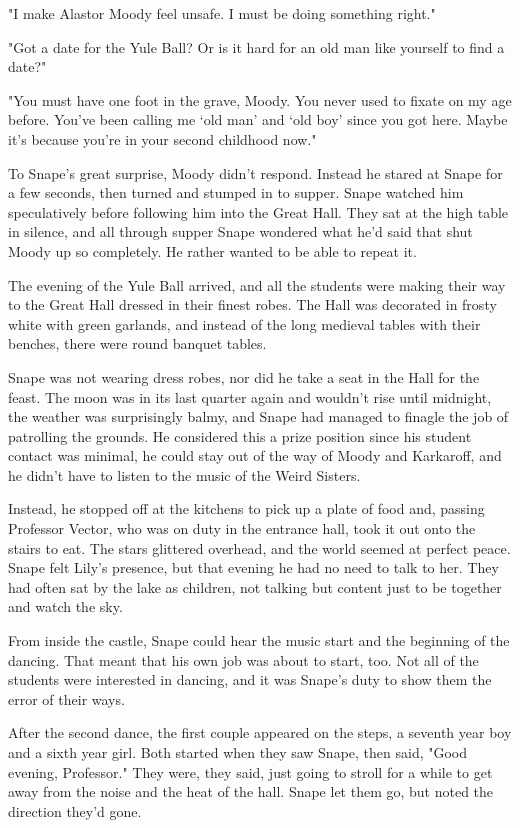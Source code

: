 "I make Alastor Moody feel unsafe. I must be doing something right."

"Got a date for the Yule Ball? Or is it hard for an old man like yourself to find a date?"

"You must have one foot in the grave, Moody. You never used to fixate on my age before. You've been calling me `old man' and `old boy' since you got here. Maybe it's because you're in your second childhood now."

To Snape's great surprise, Moody didn't respond. Instead he stared at Snape for a few seconds, then turned and stumped in to supper. Snape watched him speculatively before following him into the Great Hall. They sat at the high table in silence, and all through supper Snape wondered what he'd said that shut Moody up so completely. He rather wanted to be able to repeat it.

The evening of the Yule Ball arrived, and all the students were making their way to the Great Hall dressed in their finest robes. The Hall was decorated in frosty white with green garlands, and instead of the long medieval tables with their benches, there were round banquet tables.

Snape was not wearing dress robes, nor did he take a seat in the Hall for the feast. The moon was in its last quarter again and wouldn't rise until midnight, the weather was surprisingly balmy, and Snape had managed to finagle the job of patrolling the grounds. He considered this a prize position since his student contact was minimal, he could stay out of the way of Moody and Karkaroff, and he didn't have to listen to the music of the Weird Sisters.

Instead, he stopped off at the kitchens to pick up a plate of food and, passing Professor Vector, who was on duty in the entrance hall, took it out onto the stairs to eat. The stars glittered overhead, and the world seemed at perfect peace. Snape felt Lily's presence, but that evening he had no need to talk to her. They had often sat by the lake as children, not talking but content just to be together and watch the sky.

From inside the castle, Snape could hear the music start and the beginning of the dancing. That meant that his own job was about to start, too. Not all of the students were interested in dancing, and it was Snape's duty to show them the error of their ways.

After the second dance, the first couple appeared on the steps, a seventh year boy and a sixth year girl. Both started when they saw Snape, then said, "Good evening, Professor." They were, they said, just going to stroll for a while to get away from the noise and the heat of the hall. Snape let them go, but noted the direction they'd gone.

